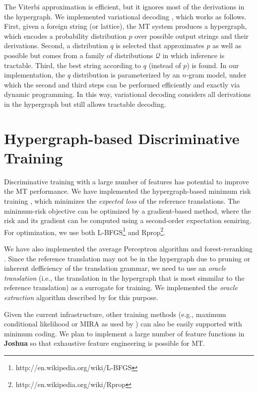 \documentclass[11pt]{article}
\newcommand{\joshua}{\textbf{Joshua}\xspace}
\begin{document}
The Viterbi approximation is efficient, but it ignores most of the derivations in the hypergraph.
We implemented variational decoding \cite{variational-decoding-acl09}, which works as follows.
First, given a foreign string (or lattice), the MT system produces a hypergraph, 
which encodes a probability distribution $p$ over 
possible output strings and their derivations.
Second, a distribution $q$ is selected that approximates $p$ as well as possible but comes from a family of distributions $\mathcal{Q}$ in which inference is tractable.  Third, the best string according to $q$ (instead of $p$) is found.
In our implementation, the $q$ distribution is parameterized by an $n$-gram model, under which 
the second and third steps can be performed efficiently and exactly via dynamic programming.
In this way, variational decoding considers all derivations in the hypergraph but still
allows tractable decoding. 



\section{Hypergraph-based Discriminative Training}

Discriminative training with a large number of features has 
potential to improve the MT performance.
We have implemented the hypergraph-based minimum risk training \cite{li-eisner:2009:EMNLP},
which minimizes the {\em expected loss} of the reference translations.
The minimum-risk objective can be optimized by a gradient-based method, where
the risk and its gradient can be computed using a second-order expectation semiring.
For optimization, we use both L-BFGS\footnote{http://en.wikipedia.org/wiki/L-BFGS} 
and Rprop\footnote{http://en.wikipedia.org/wiki/Rprop}.

We have also implemented the average Perceptron algorithm and forest-reranking \cite{zhifei-forest-reranking-galebook}.
Since the reference translation may not be in the hypergraph due to pruning or inherent
defficiency of the translation grammar, we need to use an {\em oracle translation} (i.e., the translation in
the hypergraph that is most simmilar to the reference translation) as a surrogate for training.
We implemented the {\em oracle extraction} algorithm described by 
for this purpose.

Given the current infrastructure, other training methods 
(e.g., maximum conditional likelihood or MIRA as used by )
can also be easily supported with minimum coding.
We plan to implement a large number of feature functions in \joshua so that exhaustive 
feature engineering is possible for MT.
\end{document}
